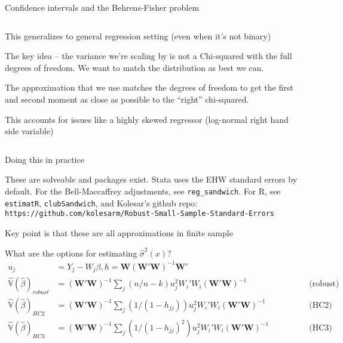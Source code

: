 \documentclass[notes,11pt, aspectratio=169]{beamer}
\newenvironment{wideitemize}{\itemize\addtolength{\itemsep}{10pt}}{\enditemize}
\begin{document}
\begin{frame}{Confidence intervals and the Behrens-Fisher problem}
\begin{columns}[T] %
\begin{column}{.8\textwidth}
  \begin{wideitemize}
  \item This generalizes to general regression setting (even when it's not binary)
  \item The key idea -- the variance we're scaling by is not a
    Chi-squared with the full degrees of freedom. We want to match the distribution as best we can.
  \item The approximation that we use matches the degrees of freedom
    to get the first and second moment as close as possible to the ``right'' chi-squared.
  \item This accounts for issues like a highly skewed regressor
    (log-normal right hand side variable)
  \end{wideitemize}
  \end{column}%
  \hfill%
  \begin{column}{.5\textwidth}
  \end{column}
\end{columns}
\end{frame}

\begin{frame}{Doing this in practice}
  \begin{wideitemize}
  \item These are solveable and packages exist. Stata uses the EHW 
    standard errors by default. For the Bell-Maccaffrey adjustments,
    see \texttt{reg\_sandwich}. For R, see \texttt{estimatR},
    \texttt{clubSandwich}, and Kolesar's github repo:
    \texttt{https://github.com/kolesarm/Robust-Small-Sample-Standard-Errors}
  \item Key point is that these are all approximations in finite sample
  \item What are the options for estimating $\hat{\sigma}^{2}(x)$?  
    \begin{align*}
      u_{j} &= Y_{j} - W_{j}\beta, h = \mathbf{W}(\mathbf{W}'\mathbf{W})^{-1}\mathbf{W}' & \\
          \hat{\mathbb{V}}(\hat{\beta})_{robust} &= (\mathbf{W}'\mathbf{W})^{-1}\sum_{j}(n/n-k) u_{j}^{2}W_{i}'W_{i}(\mathbf{W}'\mathbf{W})^{-1} \qquad \qquad&  \text{(robust)}\\
       \hat{\mathbb{V}}(\hat{\beta})_{HC2} &= (\mathbf{W}'\mathbf{W})^{-1}\sum_{j} (1/(1-h_{jj}))u_{j}^{2}W_{i}'W_{i}(\mathbf{W}'\mathbf{W})^{-1} \qquad \qquad& \text{(HC2)}\\
       \hat{\mathbb{V}}(\hat{\beta})_{HC3} &= (\mathbf{W}'\mathbf{W})^{-1}\sum_{j} (1/(1-h_{jj})^{2})u_{j}^{2}W_{i}'W_{i}(\mathbf{W}'\mathbf{W})^{-1} \qquad \qquad& \text{(HC3)}\\
    \end{align*}
    
  \end{wideitemize}
\end{frame}
\end{document}
